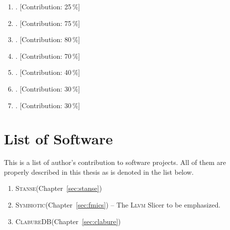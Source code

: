 \documentclass[11pt,a4paper]{book}
\newcommand{\cdb}{\textsc{ClabureDB}\xspace}
\newcommand{\llvm}{\textsc{Llvm}\xspace}
\newcommand{\stan}{\textsc{Stanse}\xspace}
\newcommand{\symbio}{\textsc{Symbiotic}\xspace}
\begin{document}
\begin{enumerate}
\item {}. [Contribution: 25\,\%]

\item \label{pub_svcomp} . [Contribution: 75\,\%]

\item \label{pub_cdb} . [Contribution: 80\,\%]

\item \label{pub_fmics} . [Contribution: 70\,\%]

\item \label{pub_stanse} . [Contribution: 40\,\%]

\item {}. [Contribution: 30\,\%]

\item {}. [Contribution: 30\,\%]

\end{enumerate}

\section{List of Software}
This is a list of author's contribution to software projects. All of them are
properly described in this thesis as is denoted in the list below.

\begin{enumerate}
\item \stan (Chapter~\ref{sec:stanse})
\item \symbio (Chapter~\ref{sec:fmics}) -- The \llvm Slicer to be emphasized.
\item \cdb (Chapter~\ref{sec:clabure})
\end{enumerate}
\end{document}
